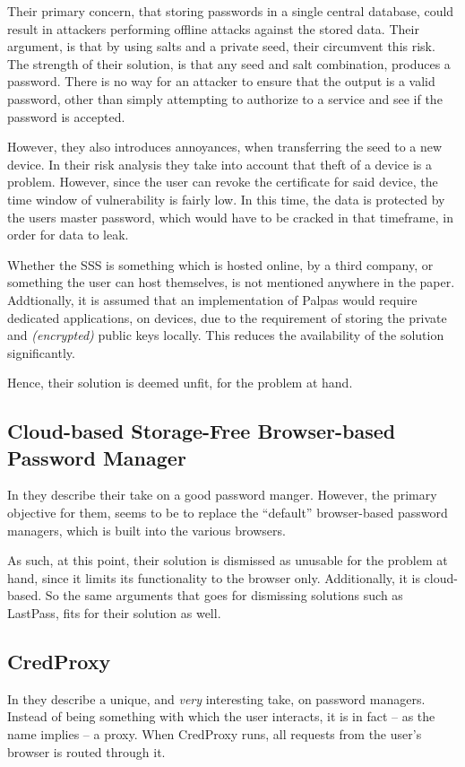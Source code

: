			Their primary concern, that storing passwords in a single central database, could result in attackers performing offline attacks against the stored data. Their argument, is that by using salts and a private seed, their circumvent this risk. The strength of their solution, is that any seed and salt combination, produces a password. There is no way for an attacker to ensure that the output is a valid password, other than simply attempting to authorize to a service and see if the password is accepted.

			However, they also introduces annoyances, when transferring the seed to a new device. In their risk analysis they take into account that theft of a device is a problem. However, since the user can revoke the certificate for said device, the time window of vulnerability is fairly low. In this time, the data is protected by the users master password, which would have to be cracked in that timeframe, in order for data to leak.

			Whether the SSS is something which is hosted online, by a third company, or something the user can host themselves, is not mentioned anywhere in the paper. Addtionally, it is assumed that an implementation of Palpas would require dedicated applications, on devices, due to the requirement of storing the private and \emph{(encrypted)} public keys locally. This reduces the availability of the solution significantly.

			Hence, their solution is deemed unfit, for the problem at hand.

		\subsection*{Cloud-based Storage-Free Browser-based Password Manager}
			In \cite{zhao2014} they describe their take on a good password manger. However, the primary objective for them, seems to be to replace the ``default'' browser-based password managers, which is built into the various browsers.

			As such, at this point, their solution is dismissed as unusable for the problem at hand, since it limits its functionality to the browser only. Additionally, it is cloud-based. So the same arguments that goes for dismissing solutions such as LastPass, fits for their solution as well. 

		\subsection*{CredProxy}
			In \cite{golrang2012} they describe a unique, and \emph{very} interesting take, on password managers. Instead of being something with which the user interacts, it is in fact -- as the name implies -- a proxy. When CredProxy runs, all requests from the user's browser is routed through it. 


